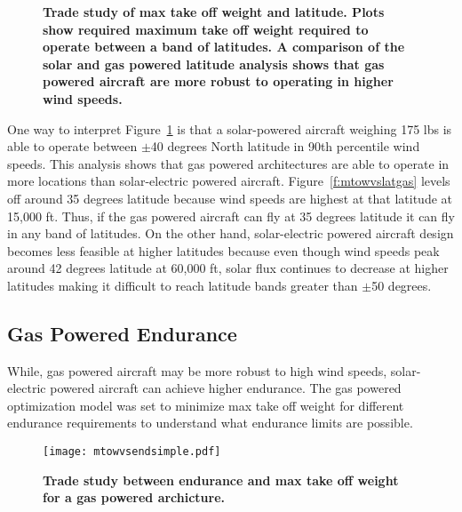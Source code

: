 \documentclass[]{aiaa-tc}%
\begin{document}
\begin{figure}[H]
 \begin{subfigmatrix}{2}%
 \end{subfigmatrix}
 \caption{\textbf{ Trade study of max take off weight and latitude. Plots show required maximum take off weight required to operate between a band of latitudes.   A comparison of the solar and gas powered latitude analysis shows that gas powered aircraft are more robust to operating in higher wind speeds. }}
 \label{f:latvsmtowtrade}
\end{figure}

One way to interpret Figure~\ref{f:latvsmtowtrade} is that a solar-powered aircraft weighing 175 lbs is able to operate between $\pm$40 degrees North latitude in 90th percentile wind speeds.  
This analysis shows that gas powered architectures are able to operate in more locations than solar-electric powered aircraft.  
Figure~\ref{f:mtowvslatgas} levels off around 35 degrees latitude because wind speeds are highest at that latitude at 15,000 ft. 
Thus, if the gas powered aircraft can fly at 35 degrees latitude it can fly in any band of latitudes.  
On the other hand, solar-electric powered aircraft design becomes less feasible at higher latitudes because even though wind speeds peak around 42 degrees latitude at 60,000 ft, solar flux continues to decrease at higher latitudes making it difficult to reach latitude bands greater than $\pm$50 degrees. 

\subsection{Gas Powered Endurance}

While, gas powered aircraft may be more robust to high wind speeds, solar-electric powered aircraft can achieve higher endurance. 
The gas powered optimization model was set to minimize max take off weight for different endurance requirements to understand what endurance limits are possible. 

\begin{figure}[H]
	\begin{center}
	\texttt{[image: mtowvsendsimple.pdf]}
    \caption{ \textbf{ Trade study between endurance and max take off weight for a gas powered archicture. }}
	\label{f:mtowvsendsimple}
	\end{center}
\end{figure}
\end{document}
